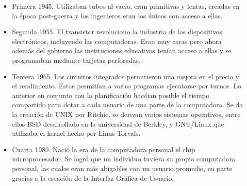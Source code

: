 \documentclass[a4paper,12pt]{article}
\begin{document}
\begin{itemize}
\item Primera 1945. Utilizaban tubos al vacío, eran primitivas y lentas, creadas en la época post-guerra y los ingenieros eran los únicos con acceso a ellas.
\item Segunda 1955. El transistor revoluciono la industria de los dispositivos electrónicos, incluyendo las computadoras. Eran muy caras pero ahora además del gobierno las instituciones educativas tenían acceso a ellas y se programaban mediante tarjetas perforadas.
\item Tercera 1965. Los circuitos integrados permitieron una mejora en el precio y el rendimiento. Estas permitían a varios programas ejecutarse por turnos. Lo anterior en conjunto con la planificación hacóian posible el tiempo compartido para dotar a cada usuario de una parte de la computadora. Se da la creación de UNIX por Ritchie, se derivan varios sistemas operativos, entre ellos BSD desarrollado en la universidad de Berkley, y GNU/Linux que utilizaba el kernel hecho por Linus Torvals.
\item Cuarta 1980. Nació la era de la computadora personal el chip microprocesador. Se logró que un individuo tuviera su propia computadora personal, las cuales eran más abigables con un usuario promedio, en parte gracias a la creación de la Interfaz Gráfica de Usuario.
\end{itemize}
\end{document}
